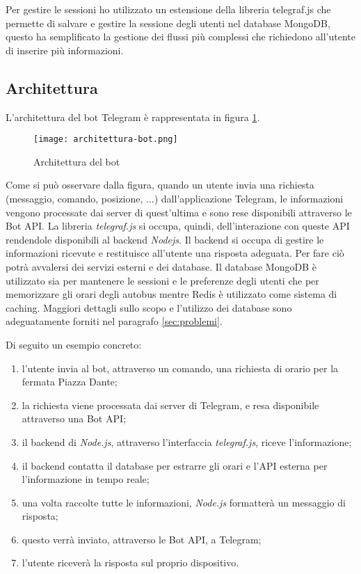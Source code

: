Per gestire le sessioni ho utilizzato un estensione della libreria telegraf.js che permette di salvare e gestire la sessione degli utenti nel database MongoDB, questo ha semplificato la gestione dei flussi più complessi che richiedono all'utente di inserire più informazioni. 

\subsection{Architettura}
\label{sec:architettura}

L'architettura del bot Telegram è rappresentata in figura \ref{fig:architettura_bot}.

\begin{figure}[h]
\centering
\texttt{[image: architettura-bot.png]}
\caption{Architettura del bot}
\label{fig:architettura_bot}
\end{figure}

Come si può osservare dalla figura, quando un utente invia una richiesta (messaggio, comando, posizione, ...) dall'applicazione Telegram, le informazioni vengono processate dai server di quest'ultima e sono rese disponibili attraverso le Bot API. La libreria \textit{telegraf.js} si occupa, quindi, dell'interazione con queste API rendendole disponibili al backend \textit{Nodejs}. Il backend si occupa di gestire le informazioni ricevute e restituisce all'utente una risposta adeguata. Per fare ciò potrà avvalersi dei servizi esterni e dei database. Il database MongoDB è utilizzato sia per mantenere le sessioni e le preferenze degli utenti che per memorizzare gli orari degli autobus mentre Redis è utilizzato come sistema di caching. Maggiori dettagli sullo scopo e l'utilizzo dei database sono adeguatamente forniti nel paragrafo \ref{sec:problemi}.

\pagebreak

\noindent Di seguito un esempio concreto: 
\begin{enumerate} 
\item l'utente invia al bot, attraverso un comando, una richiesta di orario per la fermata Piazza Dante; 
\item la richiesta viene processata dai server di Telegram, e resa disponibile attraverso una Bot API;
\item il backend di \textit{Node.js}, attraverso l'interfaccia \textit{telegraf.js}, riceve l'informazione;
\item il backend contatta il database per estrarre gli orari e l'API esterna per l'informazione in tempo reale;
\item una volta raccolte tutte le informazioni, \textit{Node.js} formatterà un messaggio di risposta; 
\item questo verrà inviato, attraverso le Bot API, a Telegram; 
\item l'utente riceverà la risposta sul proprio dispositivo. 
\end{enumerate}

